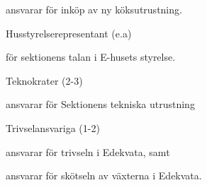 \documentclass[10pt]{article}
\begin{document}
\begin{emptylist}
\begin{dashlist}
            \item ansvarar för inköp av ny köksutrustning.
        \end{dashlist}
    \item Husstyrelserepresentant (e.a)
        \begin{dashlist}
            \item för sektionens talan i E-husets styrelse.
        \end{dashlist}
    \item Teknokrater (2-3)
        \begin{dashlist}
            \item ansvarar för Sektionens tekniska utrustning
        \end{dashlist}
    \item Trivselansvariga (1-2)
        \begin{dashlist}
            \item ansvarar för trivseln i Edekvata, samt
            \item ansvarar för skötseln av växterna i Edekvata.
        \end{dashlist}
\end{emptylist}
\end{document}
